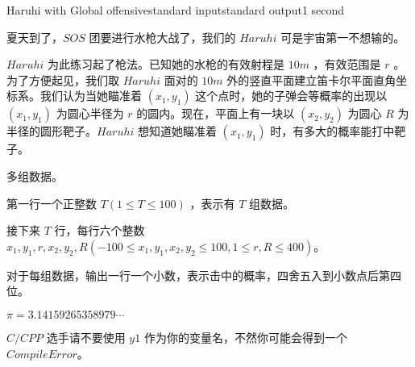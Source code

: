 \begin{problem}{Haruhi with Global offensive}{standard input}{standard output}{1 second}

夏天到了，$SOS$ 团要进行水枪大战了，我们的 $Haruhi$ 可是宇宙第一不想输的。

$Haruhi$ 为此练习起了枪法。已知她的水枪的有效射程是 $10m$ ，有效范围是 $r$ 。为了方便起见，我们取 $Haruhi$ 面对的 $10m$ 外的竖直平面建立笛卡尔平面直角坐标系。我们认为当她瞄准着 $(x_1,y_1)$ 这个点时，她的子弹会等概率的出现以 $(x_1,y_1)$ 为圆心半径为 $r$ 的圆内。现在，平面上有一块以 $(x_2,y_2)$ 为圆心 $R $ 为半径的圆形靶子。$Haruhi$ 想知道她瞄准着 $(x_1,y_1)$ 时，有多大的概率能打中靶子。

\InputFile

多组数据。

第一行一个正整数 $T(1 \leq T \leq 100)$ ，表示有 $T$ 组数据。

接下来 $T$ 行，每行六个整数 $x_1,y_1,r,x_2,y_2,R(-100 \leq x_1,y_1,x_2,y_2 \leq 100,1 \leq r,R \leq 400)$。

\OutputFile

对于每组数据，输出一行一个小数，表示击中的概率，四舍五入到小数点后第四位。

\Example
\begin{example}
%
\end{example}

\Note

$\pi=3.14159265358979 \cdots$

$C/CPP$ 选手请不要使用 $y1$ 作为你的变量名，不然你可能会得到一个 $Compile Error$。

\end{problem}
